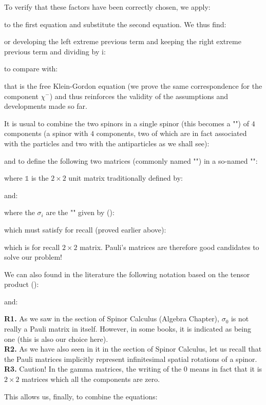 	To verify that these factors have been correctly chosen, we apply:
	
	to the first equation and substitute the second equation. We thus find:
	
	or developing the left extreme previous term and keeping the right extreme previous term and dividing by $\mathrm{i}$:
	
	to compare with:
	
	that is the free Klein-Gordon equation (we prove the same correspondence for the component $\chi^{-}$) and thus reinforces the validity of the assumptions and developments made so far.

	It is usual to combine the two spinors in a single spinor (this becomes a "") of $4$ components (a spinor with $4$ components, two of which are in fact associated with the particles and two with the antiparticles as we shall see):
	
	and to define the following two matrices (commonly named "") in a so-named "":
	
	where $\mathds{1}$ is the $2\times 2$ unit matrix traditionally defined by:
	
	and:
	
	where the $\sigma_i$ are the "\label{pauli matrices}" given by ():
	
	which must satisfy for recall (proved earlier above):
	
	which is for recall $2\times 2$ matrix. Pauli's matrices are therefore good candidates to solve our problem!
	
	We can also found in the literature the following notation based on the tensor product ():
	
	and:
	
	\begin{tcolorbox}[title=Remarks,colframe=black,arc=10pt]
	\textbf{R1.} As we saw in the section of Spinor Calculus (Algebra Chapter), $\sigma_0$ is not really a Pauli matrix in itself. However, in some books, it is indicated as being one (this is also our choice here).\\
	
	\textbf{R2.} As we have also seen in it in the section of Spinor Calculus, let us recall that the Pauli matrices implicitly represent infinitesimal spatial rotations of a spinor.\\
	
	\textbf{R3.} Caution! In the gamma matrices, the writing of the $0$ means in fact that it is $2\times 2$ matrices  which all the components are zero.
	\end{tcolorbox}	
	This allows us, finally, to combine the equations:
	
